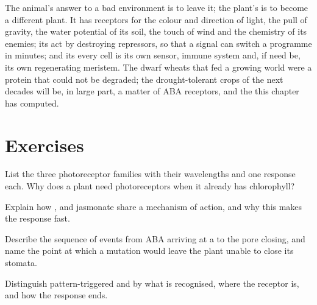 \begin{remark}\label{rem:b3:plant-molecular-physiology:remark}
The animal's answer to a bad environment is to leave it; the plant's is
to become a different plant. It has receptors for the colour and
direction of light, the pull of gravity, the water potential of its
soil, the touch of wind and the chemistry of its enemies; its 
act by destroying repressors, so that a signal can switch a programme
in minutes; and its every cell is its own sensor, immune system and,
if need be, its own regenerating meristem. The dwarf wheats that fed a
growing world were a  protein that could not be degraded; the
drought-tolerant crops of the next decades will be, in large part, a
matter of ABA receptors,  and the  this chapter has computed.
\end{remark}

\section{Exercises}

\begin{exercise}[$\star$]\label{exo:b3:plant-molecular-physiology:1}
List the three photoreceptor families with their wavelengths and one
response each. Why does a plant need photoreceptors when it already has
chlorophyll?
\end{exercise}

\begin{exercise}[$\star$]\label{exo:b3:plant-molecular-physiology:2}
Explain how ,  and jasmonate share a mechanism of
action, and why this makes the response fast.
\end{exercise}

\begin{exercise}[$\star$]\label{exo:b3:plant-molecular-physiology:3}
Describe the sequence of events from ABA arriving at a  to
the pore closing, and name the point at which a mutation would leave
the plant unable to close its stomata.
\end{exercise}

\begin{exercise}[$\star$]\label{exo:b3:plant-molecular-physiology:4}
Distinguish pattern-triggered and  by what
is recognised, where the receptor is, and how the response ends.
\end{exercise}

